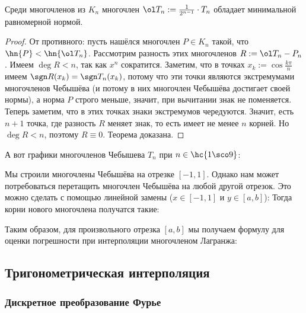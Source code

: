 \documentclass[a4paper]{article}
\begin{document}
\begin{theorem}
Среди многочленов из $K_n$ многочлен $\ol T_n :=
\frac{1}{2^{n-1}}\cdot T_n$ обладает минимальной равномерной нормой.
\end{theorem}
\begin{proof}
От противного: пусть нашёлся многочлен $P \in K_n$ такой, что $\hn{P}
< \hn{\ol T_n}$. Рассмотрим разность этих многочленов $R := \ol T_n -
P_n$. Имеем $\deg R < n$, так как $x^n$ сократится. Заметим, что в
точках $x_k := \cos \frac{k\pi}{n}$ имеем $\sgn R(x_k) = \sgn
T_n(x_k)$, потому что эти точки являются экстремумами многочленов
Чебышёва (и потому в них многочлен Чебышёва достигает своей нормы), а
норма $P$ строго меньше, значит, при вычитании знак не поменяется.
Теперь заметим, что в этих точках знаки экстремумов
чередуются. Значит, есть $n+1$ точка, где разность $R$ меняет знак, то
есть имеет не менее $n$ корней. Но $\deg R < n$, поэтому
$R\equiv0$. Теорема доказана.
\end{proof}

А вот графики многочленов Чебышева $T_n$ при $n\in \hc{1\sco9}$:

\centerline{\;\;\;\;\;
  \;\;}


Мы строили многочлены Чебышёва на отрезке $[-1,1]$. Однако нам может
потребоваться перетащить многочлен Чебышёва на любой другой
отрезок. Это можно сделать с помощью линейной замены ($x \in [-1,1]$ и
$y \in [a,b]$):   Тогда корни нового
многочлена получатся такие: 

Таким образом, для произвольного отрезка $[a,b]$ мы получаем формулу
для оценки погрешности при интерполяции многочленом Лагранжа:

\subsection{Тригонометрическая интерполяция}

\subsubsection{Дискретное преобразование Фурье}
\end{document}
